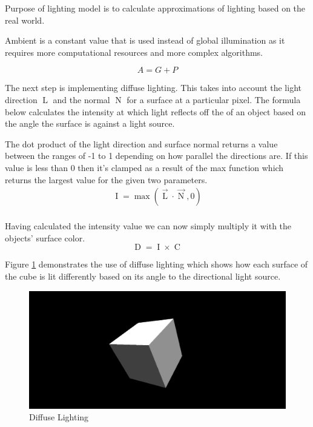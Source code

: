 \documentclass[11pt]{article}
\begin{document}
Purpose of lighting model is to calculate approximations of
lighting based on the real world.  

Ambient is a constant value that is used instead of global illumination
as it requires more computational resources and more complex algorithms.

\newcommand{\intensity}{\operatorname{I}}
\newcommand{\lightdir}{\operatorname{L}}
\newcommand{\normal}{\operatorname{N}}
\newcommand{\diffuse}{\operatorname{D}}
\newcommand{\glslcolor}{\operatorname{C}}
\newcommand{\glslmax}{\operatorname{max}}

\begin{equation}
	A = G + P
\end{equation}

The next step is implementing diffuse lighting. This takes into account the
light direction $\lightdir$ and the normal $\normal$ for a surface at a
particular pixel. The formula below calculates the intensity at which light
reflects off the of an object based on the angle the surface is against a light
source. 

The dot product of the light direction and surface normal returns a value
between the ranges of -1 to 1 depending on how parallel the directions are. If
this value is less than 0 then it's clamped as a result of the max function
which returns the largest value for the given two parameters.
\begin{gather}
	\intensity = \glslmax(\vec{\lightdir} \cdot \vec{\normal}, 0) \\
\end{gather}

Having calculated the intensity value we can now simply multiply it with the
objects' surface color.
\begin{equation}
	\diffuse = \intensity \times \glslcolor
\end{equation}

Figure \ref{fig:diffuse} demonstrates the use of diffuse lighting which shows
how each surface of the cube is lit differently based on its angle to the
directional light source. 
\begin{figure}[H]
  \centering
  \includegraphics[width=\textwidth]{images/diffuse_lighting.png}
  \caption{Diffuse Lighting}
  \label{fig:diffuse}
\end{figure}
\end{document}
